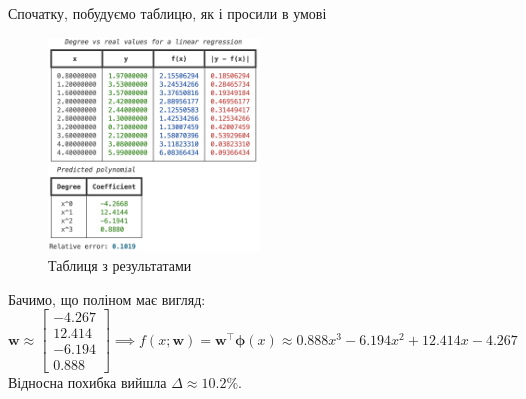 \documentclass[12pt]{extarticle}
\begin{document}
Спочатку, побудуємо таблицю, як і просили в умові
\begin{figure}[H]
    \centering
    \includegraphics[width=0.5\textwidth]{images/lab_3/table.png}
    \caption{Таблиця з результатами}
    \label{fig:1}
\end{figure}

Бачимо, що поліном має вигляд:
\[
\mathbf{w} \approx \begin{bmatrix}
    -4.267 \\
    12.414 \\
    -6.194 \\
    0.888
\end{bmatrix} \implies f(x;\mathbf{w}) = \mathbf{w}^{\top}\boldsymbol{\phi}(x) \approx 0.888x^3 - 6.194x^2 + 12.414x - 4.267
\]
Відносна похибка вийшла $\Delta \approx 10.2\%$. 

\pagebreak
\end{document}
